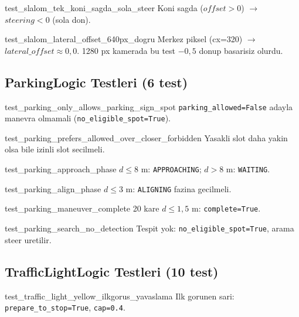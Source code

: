 \documentclass[a4paper,12pt]{article}
\begin{document}
\begin{testbox}{test\_slalom\_tek\_koni\_sagda\_sola\_steer}
Koni sagda ($offset > 0$) $\to$ $steering < 0$ (sola don).
\end{testbox}

\begin{testbox}{test\_slalom\_lateral\_offset\_640px\_dogru}
Merkez piksel (cx=320) $\to$ $lateral\_offset \approx 0{,}0$.
1280 px kamerada bu test $-0{,}5$ donup basarisiz olurdu.
\end{testbox}

\subsection{ParkingLogic Testleri (6 test)}

\begin{testbox}{test\_parking\_only\_allows\_parking\_sign\_spot}
\texttt{parking\_allowed=False} adayla manevra olmamali
(\texttt{no\_eligible\_spot=True}).
\end{testbox}

\begin{testbox}{test\_parking\_prefers\_allowed\_over\_closer\_forbidden}
Yasakli slot daha yakin olsa bile izinli slot secilmeli.
\end{testbox}

\begin{testbox}{test\_parking\_approach\_phase}
$d \leq 8$ m: \texttt{APPROACHING}; $d > 8$ m: \texttt{WAITING}.
\end{testbox}

\begin{testbox}{test\_parking\_align\_phase}
$d \leq 3$ m: \texttt{ALIGNING} fazina gecilmeli.
\end{testbox}

\begin{testbox}{test\_parking\_maneuver\_complete}
20 kare $d \leq 1{,}5$ m: \texttt{complete=True}.
\end{testbox}

\begin{testbox}{test\_parking\_search\_no\_detection}
Tespit yok: \texttt{no\_eligible\_spot=True}, arama steer uretilir.
\end{testbox}

\subsection{TrafficLightLogic Testleri (10 test)}

\begin{testbox}{test\_traffic\_light\_yellow\_ilkgorus\_yavaslama}
Ilk gorunen sari: \texttt{prepare\_to\_stop=True}, \texttt{cap=0.4}.
\end{testbox}
\end{document}
